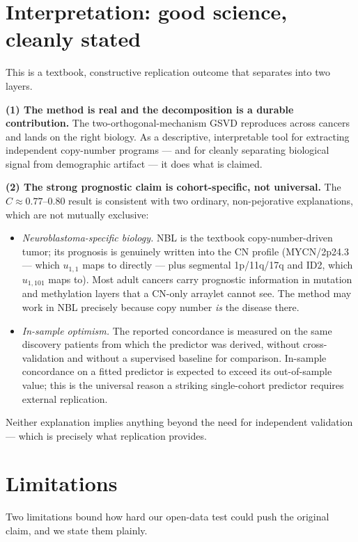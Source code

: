 \documentclass[11pt]{article}
\newcommand{\C}{\textit{C}}
\begin{document}
\section{Interpretation: good science, cleanly stated}
\label{sec:interp}

This is a textbook, constructive replication outcome that separates into two
layers.

\textbf{(1) The method is real and the decomposition is a durable contribution.}
The two-orthogonal-mechanism GSVD reproduces across cancers and lands on the right
biology. As a descriptive, interpretable tool for extracting independent
copy-number programs --- and for cleanly separating biological signal from
demographic artifact --- it does what is claimed.

\textbf{(2) The strong prognostic claim is cohort-specific, not universal.} The
$\C\approx0.77$--$0.80$ result is consistent with two ordinary, non-pejorative
explanations, which are not mutually exclusive:
\begin{itemize}[leftmargin=1.4em]
  \item \emph{Neuroblastoma-specific biology.} NBL is the textbook
  copy-number-driven tumor; its prognosis is genuinely written into the CN profile
  (MYCN/2p24.3 --- which $u_{1,1}$ maps to directly --- plus segmental 1p/11q/17q
  and ID2, which $u_{1,101}$ maps to). Most adult cancers carry prognostic
  information in mutation and methylation layers that a CN-only arraylet cannot
  see. The method may work in NBL precisely because copy number \emph{is} the
  disease there.
  \item \emph{In-sample optimism.} The reported concordance is measured on the
  same discovery patients from which the predictor was derived, without
  cross-validation and without a supervised baseline for comparison. In-sample
  concordance on a fitted predictor is expected to exceed its out-of-sample value;
  this is the universal reason a striking single-cohort predictor requires external
  replication.
\end{itemize}
Neither explanation implies anything beyond the need for independent validation
--- which is precisely what replication provides.

\section{Limitations}
\label{sec:limits}
Two limitations bound how hard our open-data test could push the original claim,
and we state them plainly.
\end{document}
